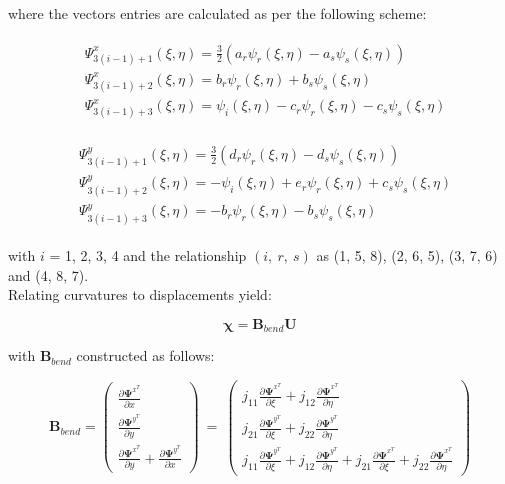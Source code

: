 where the vectors entries are calculated as per the following scheme:

\begin{gather} 
	\begin{aligned}
		&\Psi_{3(i-1)+1}^x (\xi , \eta) = \frac{3}{2} (a_r \psi_r (\xi , \eta) - a_s \psi_s (\xi , \eta) ) \\
		&\Psi_{3(i-1)+2}^x (\xi , \eta) = b_r \psi_r (\xi , \eta) + b_s \psi_s (\xi , \eta) \\
		&\Psi_{3(i-1)+3}^x (\xi , \eta) = \psi_i (\xi , \eta) - c_r \psi_r (\xi , \eta) - c_s \psi_s (\xi , \eta)
		\label{equation25}
	\end{aligned}
\end{gather}

\begin{gather} 
	\begin{aligned}
		&\Psi_{3(i-1)+1}^y (\xi , \eta) = \frac{3}{2} (d_r \psi_r (\xi , \eta) - d_s \psi_s (\xi , \eta) ) \\
		&\Psi_{3(i-1)+2}^y (\xi , \eta) = -\psi_i (\xi , \eta) + e_r \psi_r (\xi , \eta) + c_s \psi_s (\xi , \eta) \\
		&\Psi_{3(i-1)+3}^y (\xi , \eta) = -b_r \psi_r (\xi , \eta) - b_s \psi_s (\xi , \eta)
		\label{equation26}
	\end{aligned}
\end{gather}

with $i$ = 1, 2, 3, 4 and the relationship $(i,\ r,\ s)$ as (1, 5, 8), (2, 6, 5), (3, 7, 6) and (4, 8, 7).\\

Relating curvatures to displacements yield:

\begin{equation} 
\boldsymbol{\chi} = \mathbf{B}_{bend} \mathbf{U}
\label{equation27}
\end{equation}

with $\mathbf{B}_{bend}$ constructed as follows:

\begin{equation} 
\mathbf{B}_{bend} =
\begin{pmatrix}
\frac{\partial \mathbf{\Psi}^{x^T}}{\partial x} \\
\frac{\partial \mathbf{\Psi}^{y^T}}{\partial y} \\
\frac{\partial \mathbf{\Psi}^{x^T}}{\partial y} + \frac{\partial \mathbf{\Psi}^{y^T}}{\partial x}
\end{pmatrix}
\ =\ 
\begin{pmatrix}
j_{11} \frac{\partial \mathbf{\Psi}^{x^T}}{\partial \xi}  + j_{12} \frac{\partial \mathbf{\Psi}^{x^T}}{\partial \eta}  \\
j_{21} \frac{\partial \mathbf{\Psi}^{y^T}}{\partial \xi} + j_{22} \frac{\partial \mathbf{\Psi}^{y^T}}{\partial \eta} \\
j_{11} \frac{\partial \mathbf{\Psi}^{y^T}}{\partial \xi}  + j_{12} \frac{\partial \mathbf{\Psi}^{y^T}}{\partial \eta} + j_{21} \frac{\partial \mathbf{\Psi}^{x^T}}{\partial \xi} + j_{22} \frac{\partial \mathbf{\Psi}^{x^T}}{\partial \eta}
\end{pmatrix}
\label{equation28}
\end{equation}

